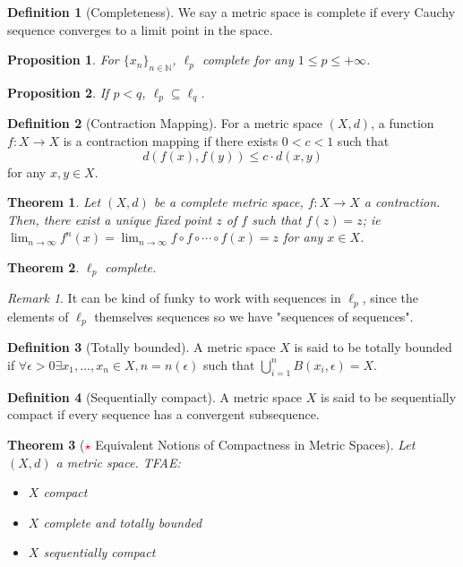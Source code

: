 \documentclass[12pt, oneside]{article}
\theoremstyle{definition}
\newtheorem{defn}{Definition}
\theoremstyle{plain}
\newtheorem{thm}{Theorem}
\newtheorem{prop}{Proposition}
\theoremstyle{remark}
\newtheorem{remark}{Remark}
\begin{document}
\begin{defn}[Completeness]
  We say a metric space is complete if every Cauchy sequence converges to a limit point in the space.
\end{defn}
\begin{prop}
  For $\{x_n\}_{n \in \mathbb{N}}$, $\ell_p$ complete for any $1 \leq p \leq +\infty$.
\end{prop}

\begin{prop}
  If $p < q$, $\ell_p \subseteq \ell_q$.
\end{prop}

\begin{defn}[Contraction Mapping]
  For a metric space $(X, d)$, a function $f : X \to X$ is a contraction mapping if there exists $0 < c < 1$ such that \[
  d(f(x), f(y)) \leq c \cdot d(x,y)  
  \]
  for any $x, y \in X$.
\end{defn}

\begin{thm}
  Let $(X, d)$ be a complete metric space, $f : X \to X$ a contraction. Then, there exist a unique fixed point $z$ of $f$ such that $f(z) = z$; ie $\lim_{n \to \infty} f^{n}(x) = \lim_{n \to \infty} f\circ f \circ \cdots \circ f(x) = z$ for any $x \in X$.
\end{thm}

\begin{thm}
  $\ell_p$ complete.
\end{thm}
\begin{remark}
  It can be kind of funky to work with sequences in $\ell_p$, since the elements of $\ell_p$ themselves sequences so we have "sequences of sequences".  
\end{remark}

\begin{defn}[Totally bounded]
  A metric space $X$ is said to be totally bounded if $\forall \epsilon > 0 \exists x_1, \dots, x_n \in X, n = n(\epsilon)$ such that $\bigcup_{i=1}^n B(x_i, \epsilon) = X$.
\end{defn}

\begin{defn}[Sequentially compact]
  A metric space $X$ is said to be sequentially compact if every sequence has a convergent subsequence.
\end{defn}

\begin{thm}[\textcolor{red}{$\star$} Equivalent Notions of Compactness in Metric Spaces]
  Let $(X, d)$ a metric space. TFAE: \begin{itemize}
    \item $X$ compact
    \item $X$ complete and totally bounded
    \item $X$ sequentially compact
  \end{itemize}
\end{thm}
\end{document}
